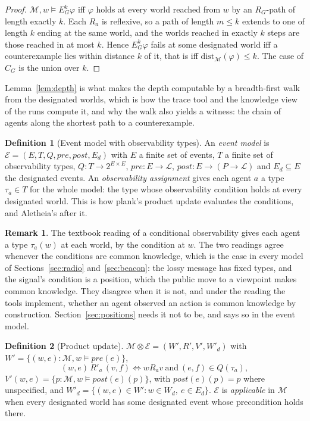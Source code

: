 \documentclass[11pt,a4paper]{article}
\theoremstyle{definition}
\newtheorem{definition}{Definition}
\newtheorem{remark}{Remark}
\newcommand{\Mod}{\mathcal{M}}
\newcommand{\Ev}{\mathcal{E}}
\newcommand{\prd}{\otimes}
\newcommand{\Eop}[1]{E_{#1}}
\newcommand{\Cop}[1]{C_{#1}}
\newcommand{\pre}{\mathit{pre}}
\newcommand{\post}{\mathit{post}}
\newcommand{\dist}{\mathrm{dist}}
\begin{document}
\begin{proof}
$\Mod, w \models \Eop{G}^k\varphi$ iff $\varphi$ holds at every world reached
from $w$ by an $R_G$-path of length exactly $k$. Each $R_a$ is reflexive, so a
path of length $m \le k$ extends to one of length $k$ ending at the same world,
and the worlds reached in exactly $k$ steps are those reached in at most $k$.
Hence $\Eop{G}^k\varphi$ fails at some designated world iff a counterexample lies
within distance $k$ of it, that is iff $\dist_\Mod(\varphi) \leq k$. The case of
$\Cop{G}$ is the union over $k$.
\end{proof}

\noindent
Lemma~\ref{lem:depth} is what makes the depth computable by a breadth-first
walk from the designated worlds, which is how the trace tool and the knowledge
view of the runs compute it, and why the walk also yields a witness: the chain
of agents along the shortest path to a counterexample.

\begin{definition}[Event model with observability types]
An \emph{event model} is $\Ev = (E, T, Q, \pre, \post, E_d)$ with $E$ a finite
set of events, $T$ a finite set of observability types, $Q : T \to 2^{E\times E}$,
$\pre : E \to \mathcal{L}$, $\post : E \to (P \to \mathcal{L})$ and
$E_d \subseteq E$ the designated events. An \emph{observability assignment}
gives each agent $a$ a type $\tau_a \in T$ for the whole model: the type whose
observability condition holds at every designated world. This is how plank's
product update evaluates the conditions, and Aletheia's after it.
\end{definition}

\begin{remark}
\label{rem:obs}
The textbook reading of a conditional observability gives each agent a type
$\tau_a(w)$ at each world, by the condition at $w$. The two readings agree
whenever the conditions are common knowledge, which is the case in every model
of Sections~\ref{sec:radio} and~\ref{sec:beacon}: the lossy message has fixed
types, and the signal's condition is a position, which the public move to a
viewpoint makes common knowledge. They disagree when it is not, and under the
reading the tools implement, whether an agent observed an action is common
knowledge by construction. Section~\ref{sec:positions} needs it not to be, and
says so in the event model.
\end{remark}

\begin{definition}[Product update]
$\Mod \prd \Ev = (W', R', V', W'_d)$ with
$W' = \{(w,e) : \Mod, w \models \pre(e)\}$,
\[
  (w,e)\, R'_a\, (v,f) \iff w R_a v \ \text{and}\ (e,f) \in Q(\tau_a),
\]
$V'(w,e) = \{p : \Mod, w \models \post(e)(p)\}$, with $\post(e)(p) = p$ where
unspecified, and $W'_d = \{(w,e) \in W' : w \in W_d,\ e \in E_d\}$. $\Ev$ is
\emph{applicable} in $\Mod$ when every designated world has some designated
event whose precondition holds there.
\end{definition}
\end{document}

